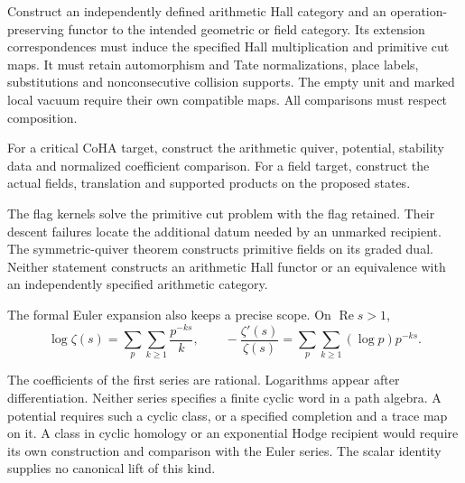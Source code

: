 \begin{question}\label{v4-arith:hall:qn:arithmetic}
Construct an independently defined arithmetic Hall category and
an operation-preserving functor to the intended geometric or field
category. Its extension correspondences must induce the specified
Hall multiplication and primitive cut maps. It must retain automorphism and Tate normalizations, place labels,
substitutions and nonconsecutive collision supports. The empty unit
and marked local vacuum require their own compatible maps.
All comparisons must respect composition.


For a critical CoHA target, construct the arithmetic quiver,
potential, stability data and normalized coefficient comparison.
For a field target, construct the actual fields, translation and
supported products on the proposed states.
\end{question}

The flag kernels solve the primitive cut problem with the flag
retained. Their descent failures locate the additional datum needed
by an unmarked recipient. The symmetric-quiver theorem constructs
primitive fields on its graded dual. Neither statement constructs
an arithmetic Hall functor or an equivalence with an independently
specified arithmetic category.

The formal Euler expansion also keeps a precise scope. On
$\operatorname{Re}s>1$,
\[
 \log\zeta(s)=\sum_p\sum_{k\geq1}\frac{p^{-ks}}k,\qquad
 -\frac{\zeta'(s)}{\zeta(s)}
       =\sum_p\sum_{k\geq1}(\log p)p^{-ks}.
\]

The coefficients of the first series are rational. Logarithms
appear after differentiation. Neither series specifies a finite
cyclic word in a path algebra. A potential requires such a cyclic
class, or a specified completion and a trace map on it. A class
in cyclic homology or an exponential Hodge recipient would require
its own construction and comparison with the Euler series.
The scalar identity supplies no canonical lift of this kind.
